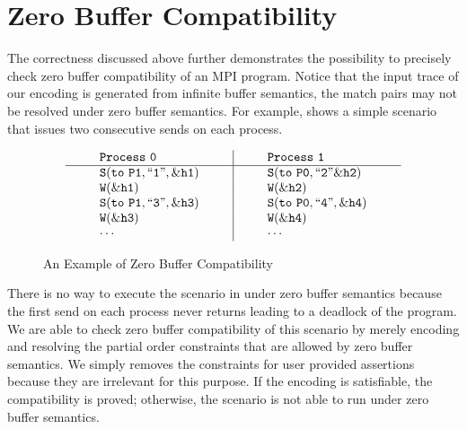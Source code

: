 \section{Zero Buffer Compatibility}
The correctness discussed above further demonstrates the possibility to precisely check zero buffer compatibility of an MPI program. Notice that the input trace of our encoding is generated from infinite buffer semantics, the match pairs may not be resolved under zero buffer semantics. For example,  shows a simple scenario that issues two consecutive sends on each process. 

\begin{figure}[h]
\[
\begin{array}{l|l}
\;\;\;\;\;\;\;\;\mathtt{Process\ 0}\;\;\;\;\;\;\;\; & \;\;\;\;\;\;\;\; \mathtt{Process\ 1}\;\;\;\;\;\;\;\; \\
\hline
\;\;\;\;\;\;\;\;\mathtt{S(to\ P1, ``1",\&h1)}\;\;\;\;\;\;\;\; & \;\;\;\;\;\;\;\; \mathtt{S(to\ P0,``2"\&h2)}\;\;\;\;\;\;\;\; \\
\;\;\;\;\;\;\;\;\mathtt{W(\&h1)}\;\;\;\;\;\;\;\; & \;\;\;\;\;\;\;\; \mathtt{W(\&h2)}\;\;\;\;\;\;\;\; \\
\;\;\;\;\;\;\;\;\mathtt{S(to\ P1,``3",\&h3)}\;\;\;\;\;\;\;\; & \;\;\;\;\;\;\;\; \mathtt{S(to\ P0,``4",\&h4)}\;\;\;\;\;\;\;\; \\
\;\;\;\;\;\;\;\;\mathtt{W(\&h3)}\;\;\;\;\;\;\;\; & \;\;\;\;\;\;\;\; \mathtt{W(\&h4)}\;\;\;\;\;\;\;\; \\
\;\;\;\;\;\;\;\;\mathtt{\cdots}\;\;\;\;\;\;\;\; & \;\;\;\;\;\;\;\; \mathtt{\cdots}\;\;\;\;\;\;\;\; 
\end{array}
\]
\caption{An Example of Zero Buffer Compatibility} \label{fig:compatible}
\end{figure}

There is no way to execute the scenario in  under zero buffer semantics because the first send on each process never returns leading to a deadlock of the program. We are able to check zero buffer compatibility of this scenario by merely encoding and resolving the partial order constraints that are allowed by zero buffer semantics. We simply removes the constraints for user provided assertions because they are irrelevant for this purpose. If the encoding is satisfiable, the compatibility is proved; otherwise, the scenario is not able to run under zero buffer semantics. 